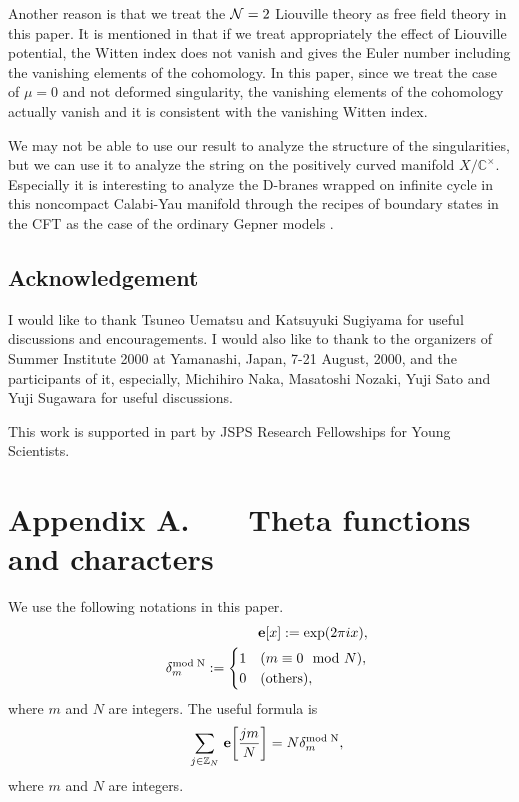 \documentclass[a4paper,12pt]{article}
\numberwithin{equation}{section}
\newcommand{\Cx}{{\mathbb C}^{\times}}
\newcommand{\Ncal}{{\cal N}}
\newcommand{\deltam}[2]{\delta^{\rm mod\;#2}_{#1}}
\newcommand{\Zb}{{\mathbb Z}}
\newcommand{\e}[1]{\,{\bf e}\!\left[#1\right]}
\begin{document}
Another reason is 
that we treat the $\Ncal=2$ Liouville theory as free field theory in
this paper.
It is mentioned in \cite{ES0009} that if we treat appropriately
the effect of Liouville potential, the Witten index does not
vanish and gives the Euler number including the vanishing elements of
the cohomology.
In this paper, since we treat the case of $\mu=0$ and not deformed
singularity, the vanishing elements of the cohomology actually 
vanish and it is consistent with the vanishing Witten index.

We may not be able to use our result to 
analyze the structure of the singularities,
but we can use it to analyze the string on the 
positively curved manifold $X/\Cx$. Especially it is
interesting to analyze the D-branes wrapped on infinite cycle
in this noncompact Calabi-Yau manifold through the recipes of
 boundary states in the CFT \cite{EGKRS0005,Ler0006,LLS0006,ES0009}
 as the case of the ordinary Gepner models
\cite{RS9712,BDLR9906,NN0001,Sug0003A}.

\subsection*{Acknowledgement}

I would like to thank Tsuneo Uematsu and Katsuyuki Sugiyama
for useful discussions and encouragements.
I would also like to thank to the organizers 
of Summer Institute 2000 at Yamanashi,
Japan, 7-21 August, 2000, and the participants of it, especially,
Michihiro Naka, Masatoshi Nozaki, Yuji Sato and Yuji Sugawara
for useful discussions.

This work is supported in part by JSPS Research Fellowships for
Young Scientists.

\newpage
\section*{Appendix A. \ \ \ Theta functions and characters}
We use the following notations in this  paper.
\begin{eqnarray*}
 &&\e{x}:=\exp(2\pi i x),\\
 &&\deltam{m}{N}:=
\begin{cases}
 1 & (m\equiv 0 \mod N),\\
 0 & ({\rm others}),
\end{cases}
\end{eqnarray*}
where $m$ and $N$ are integers.
The useful formula is
\begin{eqnarray*}
 &&\sum_{j\in \Zb_N}\e{\frac{jm}{N}}=N\deltam{m}{N},
\end{eqnarray*}
where $m$ and $N$ are integers.
\end{document}
